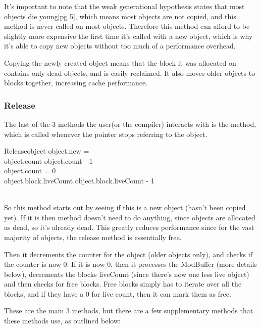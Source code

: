\documentclass{article}
\begin{document}
It's important to note that the weak generational hypothesis states that most objects die young\cite{rcimmix}[pg 5], which means most objects are not copied, and this method is never called on most objects. Therefore this method can afford to be slightly more expensive the first time it's called with a new object, which is why it's able to copy new objects without too much of a performance overhead. 

Copying the newly created object means that the block it was allocated on contains only dead objects, and is easily reclaimed. It also moves older objects to blocks together, increasing cache performance.

\subsubsection{Release}

The last of the 3 methods the user(or the compiler) interacts with is the  method, which is called whenever the pointer stops referring to the object.

\begin{pseudocode}{Release}{object}
	\IF object.new = \TRUE \THEN
		\RETURN{}\\
	object.count \GETS object.count - 1\\
	\IF object.count = 0 \THEN
	\BEGIN
		\\
		object.block.liveCount \GETS object.block.liveCount - 1\\
		\\
	\END
\end{pseudocode}

So this method starts out by seeing if this is a new object (hasn't been copied yet). If it is then  method doesn't need to do anything, since objects are allocated as dead, so it's already dead. This greatly reduces performance since for the vast majority of objects, the release method is essentially free.

Then it decrements the counter for the object (older objects only), and checks if the counter is now 0. If it is now 0, then it processes the ModBuffer (more details below), decrements the blocks liveCount (since there's now one less live object) and then checks for free blocks. Free blocks simply has to iterate over all the blocks, and if they have a 0 for live count, then it can mark them as free.

These are the main 3 methods, but there are a few supplementary methods that these methods use, as outlined below:
\end{document}
